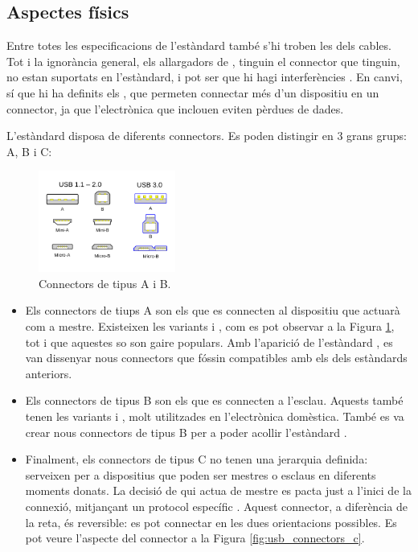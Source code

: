 \subsection{Aspectes físics}

Entre totes les especificacions de l'estàndard  també s'hi troben les
dels cables. Tot i la ignorància general, els allargadors de , tinguin
el connector que tinguin, no estan suportats en l'estàndard, i pot ser que
hi hagi interferències \cite{Contributors2024USB}. En canvi, sí que
hi ha definits els , que permeten connectar més d'un dispositiu en un
connector, ja que l'electrònica que inclouen eviten pèrdues de dades.

L'estàndard  disposa de diferents connectors. Es poden distingir en
3 grans grups: A, B i C:

\begin{figure}[ht]
    \centering
    \includegraphics[width=0.4\textwidth]{images/usb_connectors.png}
    \caption{Connectors  de tipus A i B. \cite{Contributors2024USB}}
    \label{fig:usb_connectors}
\end{figure}

\begin{itemize}
    \item Els connectors de tiups A son els que es connecten al dispositiu
    que actuarà com a mestre. Existeixen les variants  i ,
    com es pot observar a la Figura \ref{fig:usb_connectors}, tot i que aquestes
    so son gaire populars. Amb l'aparició de l'estàndard , es van
    dissenyar nous connectors que fóssin compatibles amb els dels estàndards
    anteriors.
    \item Els connectors de tipus B son els que es connecten a l'esclau. Aquests
    també tenen les variants  i , molt utilitzades
    en l'electrònica domèstica. També es va crear nous connectors de tipus B
    per a poder acollir l'estàndard .
    \item Finalment, els connectors de tipus C no tenen una jerarquia definida:
    serveixen per a dispositius que poden ser mestres o esclaus en diferents
    moments donats. La decisió de qui actua de mestre es pacta just a l'inici
    de la connexió, mitjançant un protocol específic \cite{Axelson2015USB}.
    Aquest connector, a diferència de la reta, és reversible: es pot connectar
    en les dues orientacions possibles. Es pot veure l'aspecte del connector
    a la Figura \ref{fig:usb_connectors_c}.
\end{itemize}

